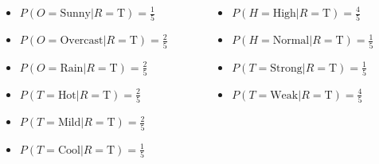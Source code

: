 \documentclass[aspectratio=169, 10pt]{beamer}
\begin{document}
\begin{frame}[t]
    \begin{columns}
        \begin{column}{0.5\textwidth}
           \begin{itemize}
               \item $P(O=\text{Sunny} | R=\text{T}) = \frac{1}{5}$
               \item $P(O=\text{Overcast} | R=\text{T}) = \frac{2}{5}$
               \item $P(O=\text{Rain} | R=\text{T}) = \frac{2}{5}$
           \end{itemize}
           \vspace{0.5em}
           \begin{itemize}
            \item $P(T=\text{Hot} | R=\text{T}) = \frac{2}{5}$
            \item $P(T=\text{Mild} | R=\text{T}) = \frac{2}{5}$
            \item $P(T=\text{Cool} | R=\text{T}) = \frac{1}{5}$
        \end{itemize}
        \end{column}
        \begin{column}{0.5\textwidth}  %
            \begin{itemize}
                \item $P(H=\text{High} | R=\text{T}) = \frac{4}{5}$
                \item $P(H=\text{Normal} | R=\text{T}) = \frac{1}{5}$
            \end{itemize}
            \vspace{0.5em}
            \begin{itemize}
                \item $P(T=\text{Strong} | R=\text{T}) = \frac{1}{5}$
                \item $P(T=\text{Weak} | R=\text{T}) = \frac{4}{5}$
            \end{itemize}        
        \end{column}
    \end{columns}
\end{frame}
\end{document}
